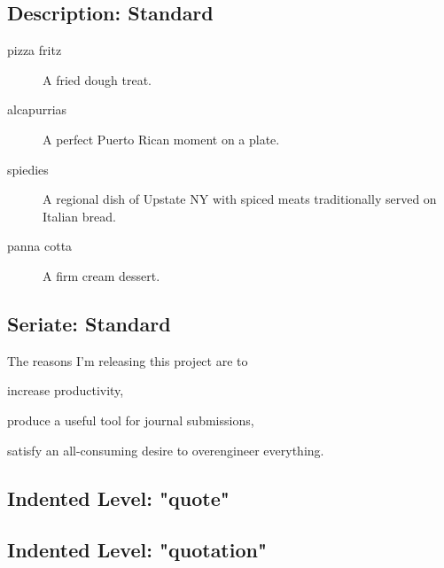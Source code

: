 \subsection{Description: Standard}
\begin{description}
  \item[pizza fritz] A fried dough treat.
  \item[alcapurrias] A perfect Puerto Rican moment on a plate.
  \item[spiedies] A regional dish of Upstate NY with spiced meats traditionally served on Italian bread.
  \item[panna cotta] A firm cream dessert.
\end{description}


\subsection{Seriate: Standard}
The reasons I'm releasing this project are to
\begin{seriate}
  \item increase productivity,
  \item produce a useful tool for journal submissions,
  \item satisfy an all-consuming desire to overengineer everything.
\end{seriate}

\subsection{Indented Level: "quote"}
\begin{quote}

  \libshort{}
\end{quote}

\subsection{Indented Level: "quotation"}
\begin{quotation}
\noindent
{}
\end{quotation}